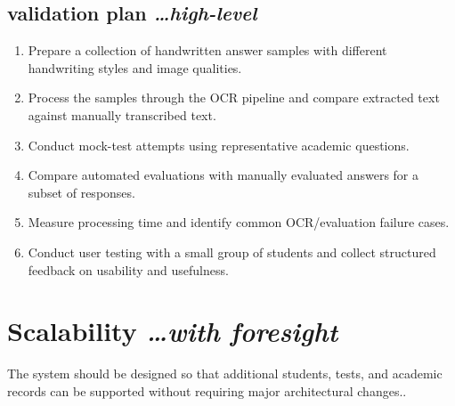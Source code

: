 \documentclass[11pt,a4paper]{article}
\newcommand{\BvrHint}[1]{%
  {\normalfont\normalsize\itshape\hfill #1}}
\begin{document}
\subsection{validation plan %
\BvrHint{\ldots high-level}}
\begin{enumerate}
    \item Prepare a collection of handwritten answer samples with different handwriting styles and image qualities.

    \item Process the samples through the OCR pipeline and compare extracted text against manually transcribed text.

    \item Conduct mock-test attempts using representative academic questions.

    \item Compare automated evaluations with manually evaluated answers for a subset of responses.

    \item Measure processing time and identify common OCR/evaluation failure cases.

    \item Conduct user testing with a small group of students and collect structured feedback on usability and usefulness.
\end{enumerate}

\section{Scalability %
\BvrHint{\ldots with foresight}}
The system should be designed so that additional students, tests, and academic records can be supported without requiring major architectural changes..
\end{document}
